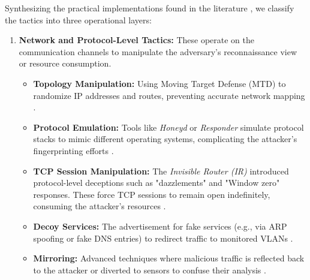 Synthesizing the practical implementations found in the literature \cite{cohen2006use,rowe2016introduction,nawrocki2016survey},
we classify the tactics into three operational layers:

\begin{enumerate}
      \item \textbf{Network and Protocol-Level Tactics:}
            These operate on the communication channels to manipulate the adversary's reconnaissance view or resource consumption.
            \begin{itemize}
                  \item \textbf{Topology Manipulation:} Using Moving Target Defense (MTD) to randomize IP addresses and
                        routes, preventing accurate network mapping \cite{jajodia2011moving}.
                  \item \textbf{Protocol Emulation:} Tools like \textit{Honeyd} or \textit{Responder} simulate protocol
                        stacks to mimic different operating systems, complicating the attacker's fingerprinting efforts
                        \cite{cohen2006use,provos2004virtual}.
                  \item \textbf{TCP Session Manipulation:} The \textit{Invisible Router (IR)} introduced protocol-level
                        deceptions such as "dazzlements" and "Window zero" responses. These force TCP sessions to remain
                        open indefinitely, consuming the attacker's resources \cite{cohen2006use}.
                  \item \textbf{Decoy Services:} The advertisement for fake services (e.g., via ARP spoofing or fake
                        DNS entries) to redirect traffic to monitored VLANs \cite{rowe2016introduction}.
                  \item \textbf{Mirroring:} Advanced techniques where malicious traffic is reflected back to the attacker
                        or diverted to sensors to confuse their analysis \cite{cohen2006use}.
            \end{itemize}


\end{enumerate}
